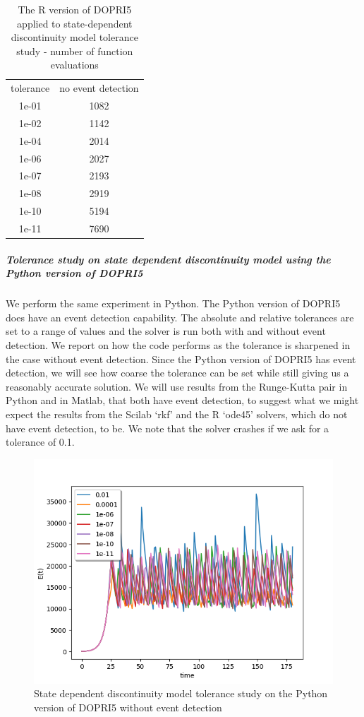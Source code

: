 \begin{table}[h]
\caption {The R version of DOPRI5 applied to state-dependent discontinuity model tolerance study - number of function evaluations} \label{tab:tolerance_state_discontinuity_rk45_R} 
\begin{center}
\begin{tabular}{ c c }
tolerance & no event detection \\
1e-01 & 1082 \\
1e-02 & 1142 \\
1e-04 & 2014 \\
1e-06 & 2027 \\
1e-07 & 2193 \\
1e-08 & 2919 \\
1e-10 & 5194 \\
1e-11 & 7690 \\
\end{tabular}
\end{center}
\end{table}

\subparagraph{Tolerance study on state dependent discontinuity model using the Python version of DOPRI5}
We perform the same experiment in Python. The Python version of DOPRI5 does have an event detection capability. The absolute and relative tolerances are set to a range of values and the solver is run both with and without event detection. We report on how the code performs as the tolerance is sharpened in the case without event detection. Since the Python version of DOPRI5 has event detection, we will see how coarse the tolerance can be set while still giving us a reasonably accurate solution. We will use results from the Runge-Kutta pair in Python and in Matlab, that both have event detection, to suggest what we might expect the results from the Scilab `rkf' and  the R `ode45' solvers, which do not have event detection, to be. We note that the solver crashes if we ask for a tolerance of 0.1.

\begin{figure}[h]
\centering
\includegraphics[width=0.7\linewidth]{./figures/tolerance_state_rk45_no_event_py}
\caption{State dependent discontinuity model tolerance study on the Python version of DOPRI5 without event detection}
\label{fig:tolerance_state_rk45_no_event_py}
\end{figure}

